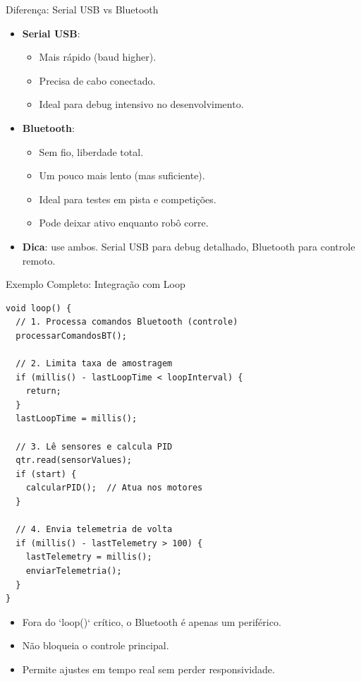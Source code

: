 \documentclass[10pt]{beamer}
\begin{document}
\begin{frame}{Diferença: Serial USB vs Bluetooth}
  \begin{itemize}
    \item \textbf{Serial USB}:
    \begin{itemize}
      \item Mais rápido (baud higher).
      \item Precisa de cabo conectado.
      \item Ideal para debug intensivo no desenvolvimento.
    \end{itemize}
    \item \textbf{Bluetooth}:
    \begin{itemize}
      \item Sem fio, liberdade total.
      \item Um pouco mais lento (mas suficiente).
      \item Ideal para testes em pista e competições.
      \item Pode deixar ativo enquanto robô corre.
    \end{itemize}
    \item \textbf{Dica}: use ambos. Serial USB para debug detalhado, Bluetooth para controle remoto.
  \end{itemize}
\end{frame}

\begin{frame}[fragile]{Exemplo Completo: Integração com Loop}
\begin{lstlisting}
void loop() {
  // 1. Processa comandos Bluetooth (controle)
  processarComandosBT();

  // 2. Limita taxa de amostragem
  if (millis() - lastLoopTime < loopInterval) {
    return;
  }
  lastLoopTime = millis();

  // 3. Lê sensores e calcula PID
  qtr.read(sensorValues);
  if (start) {
    calcularPID();  // Atua nos motores
  }

  // 4. Envia telemetria de volta
  if (millis() - lastTelemetry > 100) {
    lastTelemetry = millis();
    enviarTelemetria();
  }
}
\end{lstlisting}

  \begin{itemize}
    \item Fora do `loop()` crítico, o Bluetooth é apenas um periférico.
    \item Não bloqueia o controle principal.
    \item Permite ajustes em tempo real sem perder responsividade.
  \end{itemize}
\end{frame}
\end{document}
